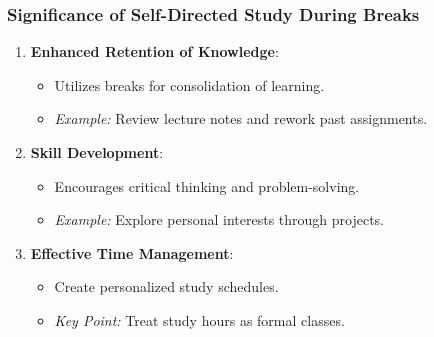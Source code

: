 \documentclass[aspectratio=169]{beamer}
\begin{document}
\begin{frame}[fragile]
    \frametitle{Significance of Self-Directed Study During Breaks}
    \begin{enumerate}
        \item \textbf{Enhanced Retention of Knowledge}:
            \begin{itemize}
                \item Utilizes breaks for consolidation of learning.
                \item \textit{Example:} Review lecture notes and rework past assignments.
            \end{itemize}
        \item \textbf{Skill Development}:
            \begin{itemize}
                \item Encourages critical thinking and problem-solving.
                \item \textit{Example:} Explore personal interests through projects.
            \end{itemize}
        \item \textbf{Effective Time Management}:
            \begin{itemize}
                \item Create personalized study schedules.
                \item \textit{Key Point:} Treat study hours as formal classes.
            \end{itemize}
    \end{enumerate}
\end{frame}
\end{document}
